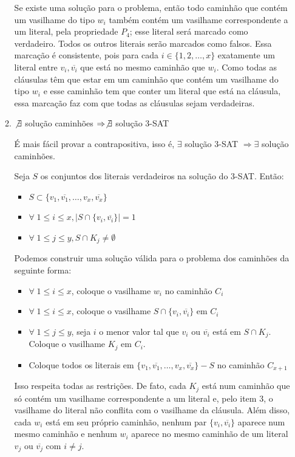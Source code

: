\documentclass[11pt]{article}
\begin{document}
\begin{enumerate}
\begin{enumerate}
Se existe uma solução para o problema, então todo caminhão que contém
um vasilhame do tipo $w_i$ também contém um vasilhame correspondente a
um literal, pela propriedade $P_4$; esse literal será marcado como
verdadeiro. Todos os outros literais serão marcados como falsos. Essa
marcação é consistente, pois para cada $i \in \{1, 2, \ldots, x\}$
exatamente um literal entre $v_i, \overline{v_i}$ que está no mesmo
caminhão que $w_i$. Como todas as cláusulas têm que estar em um
caminhão que contém um vasilhame do tipo $w_i$ e esse caminhão tem que
conter um literal que está na cláusula, essa marcação faz com que
todas as cláusulas sejam verdadeiras.


\item $\not \exists$ solução caminhões $\Rightarrow \not \exists$ solução 3-SAT
\label{sec-6-3-3-2-2}

É mais fácil provar a contrapositiva, isso é, $\exists$ solução 3-SAT
$\Rightarrow \exists$ solução caminhões.

Seja $S$ os conjuntos dos literais verdadeiros na solução do 3-SAT.
Então:
\begin{itemize}
\item $S \subset \{v_1,\overline{v_1}, \ldots, v_x, \overline{v_x}\}$
\item $\forall \; 1\leq i \leq x, |S\cap\{v_i, \overline{v_i}\}| = 1$
\item $\forall \; 1\leq j \leq y, S\cap K_j \neq \emptyset$
\end{itemize}

Podemos construir uma solução válida para o problema dos caminhões da
seguinte forma:
\begin{itemize}
\item $\forall \; 1\leq i \leq x$, coloque o vasilhame $w_i$ no caminhão $C_i$
\item $\forall \; 1\leq i \leq x$, coloque o vasilhame $S\cap\{v_i, \overline{v_i}\}$ em $C_i$
\item $\forall \; 1\leq j \leq y$, seja $i$ o menor valor tal que $v_i$ ou
$\overline{v_i}$ está em $S\cap K_j$. Coloque o vasilhame $K_j$ em $C_i$.
\item Coloque todos os literais em $\{v_1,\overline{v_1}, \ldots, v_x,
  \overline{v_x}\} - S$ no caminhão $C_{x+1}$
\end{itemize}


Isso respeita todas as restrições. De fato, cada $K_j$ está num
caminhão que só contém um vasilhame correspondente a um literal e,
pelo item 3, o vasilhame do literal não conflita com o vasilhame da
cláusula. Além disso, cada $w_i$ está em seu próprio caminhão, nenhum
par $\{v_i, \overline{v_i}\}$ aparece num mesmo caminhão e nenhum
$w_i$ aparece no mesmo caminhão de um literal $v_j$ ou
$\overline{v_j}$ com $i \neq j$.


\end{enumerate}
\end{enumerate}
\end{document}
